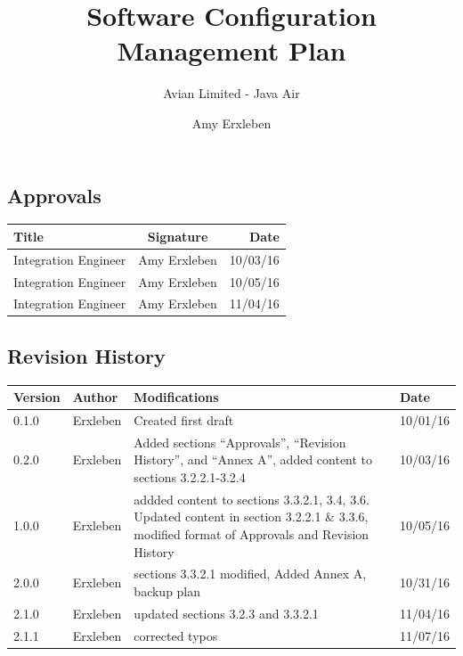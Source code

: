 \documentclass{scrartcl}
\begin{document}
\title{Software Configuration Management Plan}
\subtitle{Avian Limited - Java Air}
\author{Amy Erxleben}

\maketitle
\newpage
\subsection*{Approvals}

\begin{center}
\begin{tabular}{|  l | c | r | }
\hline
  \textbf{Title} & \textbf{Signature} & \textbf{Date} \\ \hline
  Integration Engineer &  \oeschfamily Amy Erxleben & 10/03/16 \\ \hline
  Integration Engineer & \oeschfamily Amy Erxleben & 10/05/16 \\ \hline
  Integration Engineer & \oeschfamily Amy Erxleben & 11/04/16 \\ \hline
\end{tabular}
\end{center}

\subsection*{Revision History}

\begin{center}
\begin{tabular}{| l | l | p{10cm} | l |}
\hline
\textbf{Version} & \textbf{Author} & \textbf{Modifications} & \textbf{Date} \\ \hline
0.1.0 & Erxleben & Created first draft  & 10/01/16 \\ \hline
0.2.0 & Erxleben & Added sections ``Approvals'', ``Revision History'', and ``Annex A'', added content to sections 3.2.2.1-3.2.4 & 10/03/16 \\ \hline
1.0.0 & Erxleben & addded content to sections 3.3.2.1, 3.4, 3.6.  Updated content in section 3.2.2.1 \& 3.3.6, modified format of Approvals and Revision History & 10/05/16 \\ \hline
2.0.0 & Erxleben & sections 3.3.2.1 modified, Added Annex A, backup plan & 10/31/16\\ \hline
2.1.0 & Erxleben & updated sections 3.2.3 and 3.3.2.1 &11/04/16 \\ \hline
2.1.1 & Erxleben & corrected typos & 11/07/16 \\ \hline
\end{tabular}
\end{center}
\newpage
\end{document}
